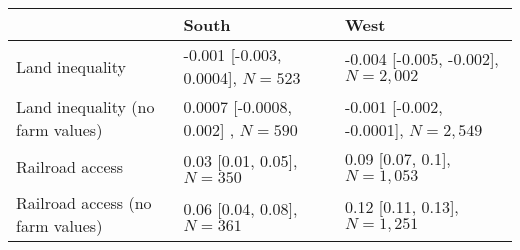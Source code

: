 \begin{tabular}{@{}lll@{}} 
		\toprule
		\backslashbox{Outcome}{Region} & South                     & West                        \\ \midrule
		Land inequality              & -0.001 [-0.003, 0.0004], $N=523$ &  -0.004 [-0.005, -0.002], $N=2,002$   \\
		Land inequality (no farm values)     & 0.0007 [-0.0008, 0.002] , $N=590$ &  -0.001 [-0.002, -0.0001], $N=2,549$   \\
		Railroad access             & 0.03 [0.01, 0.05], $N=350$     & 0.09 [0.07, 0.1], $N=1,053$      \\ 
		Railroad access (no farm values)            & 0.06 [0.04, 0.08], $N=361$     & 0.12 [0.11, 0.13], $N=1,251$      \\ \bottomrule
	\end{tabular}